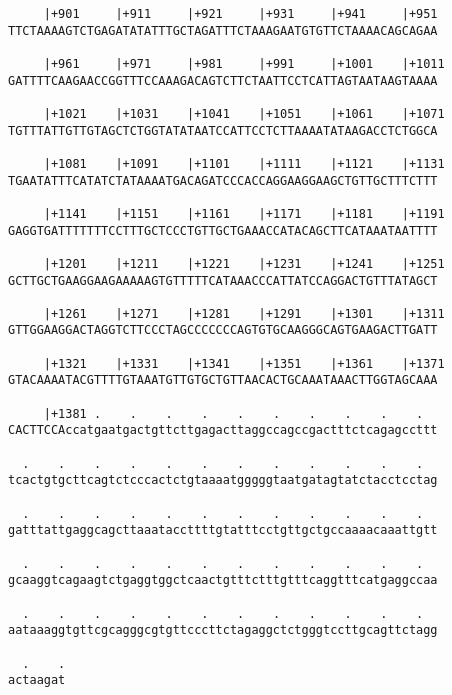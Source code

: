 \documentclass{article}
\begin{document}
\begin{Verbatim}
     |+901     |+911     |+921     |+931     |+941     |+951
TTCTAAAAGTCTGAGATATATTTGCTAGATTTCTAAAGAATGTGTTCTAAAACAGCAGAA
                                                            
     |+961     |+971     |+981     |+991     |+1001    |+1011
GATTTTCAAGAACCGGTTTCCAAAGACAGTCTTCTAATTCCTCATTAGTAATAAGTAAAA
                                                            
     |+1021    |+1031    |+1041    |+1051    |+1061    |+1071
TGTTTATTGTTGTAGCTCTGGTATATAATCCATTCCTCTTAAAATATAAGACCTCTGGCA
                                                            
     |+1081    |+1091    |+1101    |+1111    |+1121    |+1131
TGAATATTTCATATCTATAAAATGACAGATCCCACCAGGAAGGAAGCTGTTGCTTTCTTT
                                                            
     |+1141    |+1151    |+1161    |+1171    |+1181    |+1191
GAGGTGATTTTTTTCCTTTGCTCCCTGTTGCTGAAACCATACAGCTTCATAAATAATTTT
                                                            
     |+1201    |+1211    |+1221    |+1231    |+1241    |+1251
GCTTGCTGAAGGAAGAAAAAGTGTTTTTCATAAACCCATTATCCAGGACTGTTTATAGCT
                                                            
     |+1261    |+1271    |+1281    |+1291    |+1301    |+1311
GTTGGAAGGACTAGGTCTTCCCTAGCCCCCCCAGTGTGCAAGGGCAGTGAAGACTTGATT
                                                            
     |+1321    |+1331    |+1341    |+1351    |+1361    |+1371
GTACAAAATACGTTTTGTAAATGTTGTGCTGTTAACACTGCAAATAAACTTGGTAGCAAA
                                                            
     |+1381 .    .    .    .    .    .    .    .    .    .  
CACTTCCAccatgaatgactgttcttgagacttaggccagccgactttctcagagccttt
                                                            
  .    .    .    .    .    .    .    .    .    .    .    .  
tcactgtgcttcagtctcccactctgtaaaatgggggtaatgatagtatctacctcctag
                                                            
  .    .    .    .    .    .    .    .    .    .    .    .  
gatttattgaggcagcttaaataccttttgtatttcctgttgctgccaaaacaaattgtt
                                                            
  .    .    .    .    .    .    .    .    .    .    .    .  
gcaaggtcagaagtctgaggtggctcaactgtttctttgtttcaggtttcatgaggccaa
                                                            
  .    .    .    .    .    .    .    .    .    .    .    .  
aataaaggtgttcgcagggcgtgttcccttctagaggctctgggtccttgcagttctagg
                                                            
  .    .
actaagat
        
        
\end{Verbatim}
\end{document}
